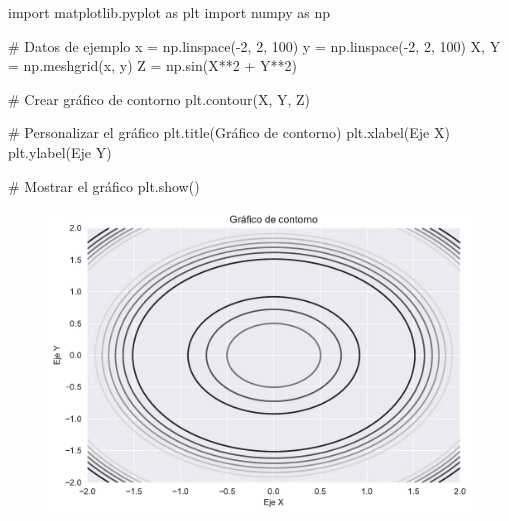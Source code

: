 \documentclass[
  a4paper,
]{article}
\newenvironment{Shaded}{}{}
\newcommand{\CommentTok}[1]{\textcolor[rgb]{0.42,0.45,0.49}{#1}}
\newcommand{\DecValTok}[1]{\textcolor[rgb]{0.00,0.36,0.77}{#1}}
\newcommand{\ImportTok}[1]{\textcolor[rgb]{0.01,0.18,0.38}{#1}}
\newcommand{\NormalTok}[1]{\textcolor[rgb]{0.14,0.16,0.18}{#1}}
\newcommand{\OperatorTok}[1]{\textcolor[rgb]{0.14,0.16,0.18}{#1}}
\newcommand{\StringTok}[1]{\textcolor[rgb]{0.01,0.18,0.38}{#1}}
\begin{document}
\begin{Shaded}
\begin{Highlighting}[]
\ImportTok{import}\NormalTok{ matplotlib.pyplot }\ImportTok{as}\NormalTok{ plt}
\ImportTok{import}\NormalTok{ numpy }\ImportTok{as}\NormalTok{ np}

\CommentTok{\# Datos de ejemplo}
\NormalTok{x }\OperatorTok{=}\NormalTok{ np.linspace(}\OperatorTok{{-}}\DecValTok{2}\NormalTok{, }\DecValTok{2}\NormalTok{, }\DecValTok{100}\NormalTok{)}
\NormalTok{y }\OperatorTok{=}\NormalTok{ np.linspace(}\OperatorTok{{-}}\DecValTok{2}\NormalTok{, }\DecValTok{2}\NormalTok{, }\DecValTok{100}\NormalTok{)}
\NormalTok{X, Y }\OperatorTok{=}\NormalTok{ np.meshgrid(x, y)}
\NormalTok{Z }\OperatorTok{=}\NormalTok{ np.sin(X}\OperatorTok{**}\DecValTok{2} \OperatorTok{+}\NormalTok{ Y}\OperatorTok{**}\DecValTok{2}\NormalTok{)}

\CommentTok{\# Crear gráfico de contorno}
\NormalTok{plt.contour(X, Y, Z)}

\CommentTok{\# Personalizar el gráfico}
\NormalTok{plt.title(}\StringTok{\textquotesingle{}Gráfico de contorno\textquotesingle{}}\NormalTok{)}
\NormalTok{plt.xlabel(}\StringTok{\textquotesingle{}Eje X\textquotesingle{}}\NormalTok{)}
\NormalTok{plt.ylabel(}\StringTok{\textquotesingle{}Eje Y\textquotesingle{}}\NormalTok{)}

\CommentTok{\# Mostrar el gráfico}
\NormalTok{plt.show()}
\end{Highlighting}
\end{Shaded}

\begin{figure}[H]

{\centering \includegraphics{index_files/figure-pdf/cell-15-output-1.pdf}

}

\end{figure}
\end{document}

